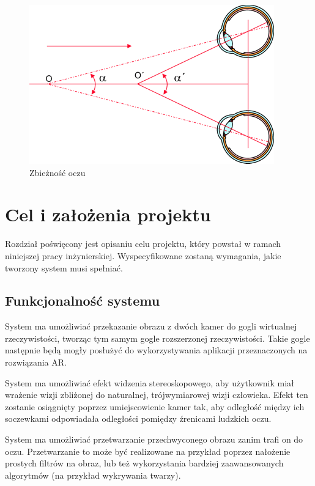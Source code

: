 \documentclass[a4paper,11pt,twoside]{report}
\theoremstyle{definition}
\begin{document}
\begin{figure}[h]
\centering
\includegraphics[scale=1]{images/zbieznosc}
\caption[Zbieżność oczu (źródło: http://www.swiatlo.tak.pl/1/index.php/funkcje-wzroku-akomodacja-adaptacja-zbieznosc/)]{Zbieżność oczu}
\end{figure}

\chapter{Cel i założenia projektu} %

Rozdział poświęcony jest opisaniu celu projektu, który powstał w ramach niniejszej pracy inżynierskiej. Wyspecyfikowane zostaną wymagania, jakie tworzony system musi spełniać.

\section{Funkcjonalność systemu}
System ma umożliwiać przekazanie obrazu z dwóch kamer do gogli wirtualnej rzeczywistości, tworząc tym samym gogle rozszerzonej rzeczywistości. Takie gogle następnie będą mogły posłużyć do wykorzystywania aplikacji przeznaczonych na rozwiązania AR. 

System ma umożliwiać efekt widzenia stereoskopowego, aby użytkownik miał wrażenie wizji zbliżonej do naturalnej, trójwymiarowej wizji człowieka. Efekt ten zostanie osiągnięty poprzez umiejscowienie kamer tak, aby odległość między ich soczewkami odpowiadała odległości pomiędzy źrenicami ludzkich oczu. 

System ma umożliwiać przetwarzanie przechwyconego obrazu zanim trafi on do oczu. Przetwarzanie to może być realizowane na przykład poprzez nałożenie prostych filtrów na obraz, lub też wykorzystania bardziej zaawansowanych algorytmów (na przykład wykrywania twarzy).
\end{document}
